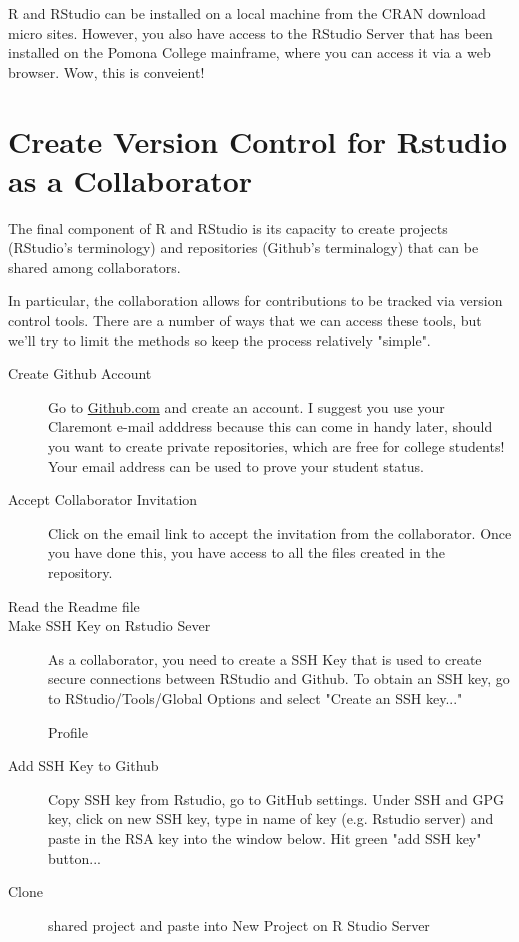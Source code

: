 \documentclass{article}
\begin{document}
R and RStudio can be installed on a local machine from the CRAN download micro sites. However, you also have access to the RStudio Server that has been installed on the Pomona College mainframe, where you can access it via a web browser. Wow, this is conveient!

\section{Create Version Control for Rstudio as a Collaborator}

The final component of R and RStudio is its capacity to create projects (RStudio's terminology) and repositories (Github's terminalogy) that can be shared among collaborators. 

In particular, the collaboration allows for contributions to be tracked via version control tools. There are a number of ways that we can access these tools, but we'll try to limit the methods so keep the process relatively "simple".

\begin{description}
  \item[Create Github Account] Go to \href{http:\\github.com}{Github.com} and create an account. I suggest you use your Claremont e-mail adddress because this can come in handy later, should you want to create private repositories, which are free for college students! Your email address can be used to prove your student status.
  
  \item[Accept Collaborator Invitation] Click on the email link to accept the invitation from the collaborator. Once you have done this, you have access to all the files created in the repository. 
  
  \item[Read the Readme file]

  \item[Make SSH Key on Rstudio Sever] As a collaborator, you need to create a SSH Key that is used to create secure connections between RStudio and Github. To obtain an SSH key, go to RStudio/Tools/Global Options and select "Create an SSH key..."
  
  Profile
  \item[Add SSH Key to Github] Copy SSH key from Rstudio, go to GitHub settings. Under SSH and GPG key, click on new SSH key, type in name of key (e.g. Rstudio server) and paste in the RSA key into the window below. Hit green "add SSH key" button...
  \item[Clone] shared project and paste into New Project on R Studio Server
\end{description}
\end{document}
